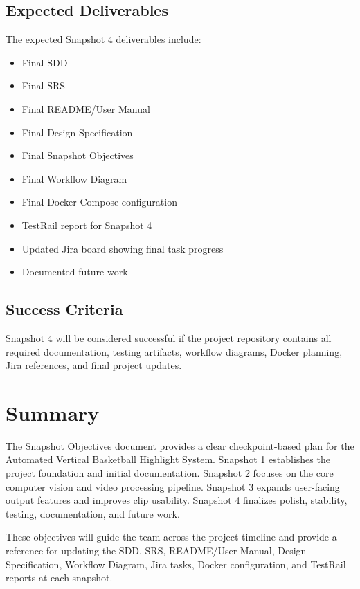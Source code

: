 \documentclass[12pt]{article}
\begin{document}
\subsection{Expected Deliverables}
The expected Snapshot 4 deliverables include:

\begin{itemize}[noitemsep]
    \item Final SDD
    \item Final SRS
    \item Final README/User Manual
    \item Final Design Specification
    \item Final Snapshot Objectives
    \item Final Workflow Diagram
    \item Final Docker Compose configuration
    \item TestRail report for Snapshot 4
    \item Updated Jira board showing final task progress
    \item Documented future work
\end{itemize}

\subsection{Success Criteria}
Snapshot 4 will be considered successful if the project repository contains all required documentation, testing artifacts, workflow diagrams, Docker planning, Jira references, and final project updates.

\newpage

\section{Summary}

The Snapshot Objectives document provides a clear checkpoint-based plan for the Automated Vertical Basketball Highlight System. Snapshot 1 establishes the project foundation and initial documentation. Snapshot 2 focuses on the core computer vision and video processing pipeline. Snapshot 3 expands user-facing output features and improves clip usability. Snapshot 4 finalizes polish, stability, testing, documentation, and future work.

These objectives will guide the team across the project timeline and provide a reference for updating the SDD, SRS, README/User Manual, Design Specification, Workflow Diagram, Jira tasks, Docker configuration, and TestRail reports at each snapshot.
\end{document}
